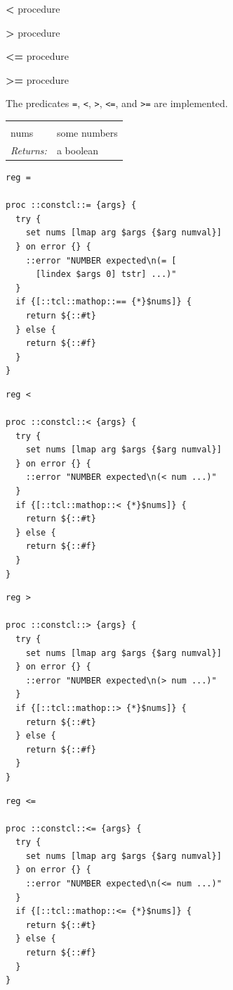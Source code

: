 \documentclass[a5paper,draft]{memoir}
\begin{document}
\noindent \textbf{<} procedure

\noindent \textbf{>} procedure

\noindent \textbf{<=} procedure

\noindent \textbf{>=} procedure

The predicates \texttt{=}, \texttt{<}, \texttt{>}, \texttt{<=}, and \texttt{>=} are implemented.

\noindent\begin{tabular}{ |p{1.9cm} p{6.5cm}| }
\hline
\rowcolor[HTML]{CCCCCC} \multicolumn{2}{|l|}{\textbf{=, <, >, <=, >= (public)}} \\
nums & some numbers \\
\textit{Returns:} & a boolean \\
\hline
\end{tabular}

\begin{lstlisting}
reg =

proc ::constcl::= {args} {
  try {
    set nums [lmap arg $args {$arg numval}]
  } on error {} {
    ::error "NUMBER expected\n(= [
      [lindex $args 0] tstr] ...)"
  }
  if {[::tcl::mathop::== {*}$nums]} {
    return ${::#t}
  } else {
    return ${::#f}
  }
}
\end{lstlisting}

\begin{lstlisting}
reg <

proc ::constcl::< {args} {
  try {
    set nums [lmap arg $args {$arg numval}]
  } on error {} {
    ::error "NUMBER expected\n(< num ...)"
  }
  if {[::tcl::mathop::< {*}$nums]} {
    return ${::#t}
  } else {
    return ${::#f}
  }
}
\end{lstlisting}

\begin{lstlisting}
reg >

proc ::constcl::> {args} {
  try {
    set nums [lmap arg $args {$arg numval}]
  } on error {} {
    ::error "NUMBER expected\n(> num ...)"
  }
  if {[::tcl::mathop::> {*}$nums]} {
    return ${::#t}
  } else {
    return ${::#f}
  }
}
\end{lstlisting}

\begin{lstlisting}
reg <=

proc ::constcl::<= {args} {
  try {
    set nums [lmap arg $args {$arg numval}]
  } on error {} {
    ::error "NUMBER expected\n(<= num ...)"
  }
  if {[::tcl::mathop::<= {*}$nums]} {
    return ${::#t}
  } else {
    return ${::#f}
  }
}
\end{lstlisting}
\end{document}
